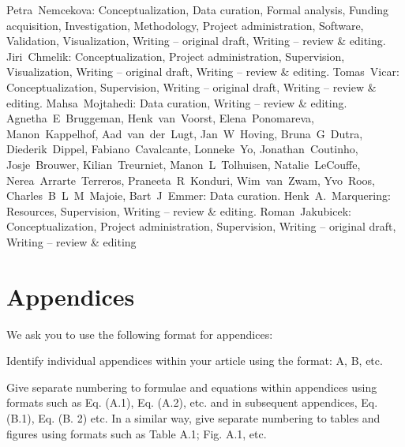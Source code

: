 \documentclass[preprint,12pt]{elsarticle}
\begin{document}
Petra~Nemcekova: Conceptualization, Data curation, Formal analysis, Funding acquisition, Investigation, Methodology, Project administration, Software, Validation, Visualization, Writing – original draft, Writing – review \& editing. Jiri~Chmelik: Conceptualization, Project administration, Supervision, Visualization, Writing – original draft, Writing – review \& editing. Tomas~Vicar: Conceptualization, Supervision, Writing – original draft, Writing – review \& editing. Mahsa~Mojtahedi: Data curation, Writing – review \& editing. Agnetha~E~Bruggeman, Henk~van~Voorst, Elena~Ponomareva, Manon~Kappelhof, Aad~van~der~Lugt, Jan~W~Hoving, Bruna~G~Dutra, Diederik~Dippel, Fabiano~Cavalcante, Lonneke~Yo, Jonathan~Coutinho, Josje~Brouwer, Kilian~Treurniet, Manon~L~Tolhuisen, Natalie~LeCouffe, Nerea~Arrarte~Terreros, Praneeta~R~Konduri, Wim~van~Zwam, Yvo~Roos, Charles~B~L~M~Majoie, Bart~J~Emmer: Data curation. Henk~A.~Marquering: Resources, Supervision, Writing – review \& editing. Roman~Jakubicek: Conceptualization, Project administration, Supervision, Writing – original draft, Writing – review \& editing

\section{Appendices}
We ask you to use the following format for appendices:

Identify individual appendices within your article using the format: A, B, etc.

Give separate numbering to formulae and equations within appendices using formats such as Eq. (A.1), Eq. (A.2), etc. and in subsequent appendices, Eq. (B.1), Eq. (B. 2) etc. In a similar way, give separate numbering to tables and figures using formats such as Table A.1; Fig. A.1, etc.




\end{document}
